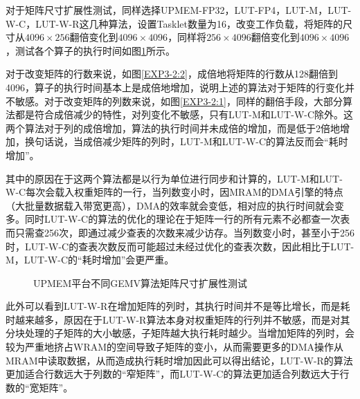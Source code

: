 对于矩阵尺寸扩展性测试，同样选择UPMEM-FP32，LUT-FP4，LUT-M，LUT-W-C，LUT-W-R这几种算法，设置Tasklet数量为16，改变工作负载，将矩阵的尺寸从$4096\times 256$翻倍变化到$4096\times 4096$，同样将$256\times 4096$翻倍变化到$4096\times 4096$，测试各个算子的执行时间如图\ref{EXP3-2}所示。

对于改变矩阵的行数来说，如图\ref{EXP3-2:2}，成倍地将矩阵的行数从128翻倍到4096，算子的执行时间基本上是成倍地增加，说明上述的算法对于矩阵的行变化并不敏感。对于改变矩阵的列数来说，如图\ref{EXP3-2:1}，同样的翻倍手段，大部分算法都是符合成倍减少的特性，对列变化不敏感，只有LUT-M和LUT-W-C除外。这两个算法对于列的成倍增加，算法的执行时间并未成倍的增加，而是低于2倍地增加，换句话说，当成倍减少矩阵的列时，LUT-M和LUT-W-C的算法反而会“耗时增加”。

其中的原因在于这两个算法都是以行为单位进行同步和计算的，LUT-M和LUT-W-C每次会载入权重矩阵的一行，当列数变小时，因MRAM的DMA引擎的特点（大批量数据载入带宽更高），DMA的效率就会变低，相对应的执行时间就会变多。同时LUT-W-C的算法的优化的理论在于矩阵一行的所有元素不必都查一次表而只需查256次，即通过减少查表的次数来减少访存。当列数变小时，甚至小于256时，LUT-W-C的查表次数反而可能超过未经过优化的查表次数，因此相比于LUT-M，LUT-W-C的“耗时增加”会更严重。

\begin{figure}[htbp!]
	\centering
	\caption{UPMEM平台不同GEMV算法矩阵尺寸扩展性测试}
	\label{EXP3-2}
\end{figure}

此外可以看到LUT-W-R在增加矩阵的列时，其执行时间并不是等比增长，而是耗时越来越多，原因在于LUT-W-R算法本身对权重矩阵的行列并不敏感，而是对其分块处理的子矩阵的大小敏感，子矩阵越大执行耗时越少。当增加矩阵的列时，会较为严重地挤占WRAM的空间导致子矩阵的变小，从而需要更多的DMA操作从MRAM中读取数据，从而造成执行耗时增加因此可以得出结论，LUT-W-R的算法更加适合行数远大于列数的“窄矩阵”，而LUT-W-C的算法更加适合列数远大于行数的“宽矩阵”。

